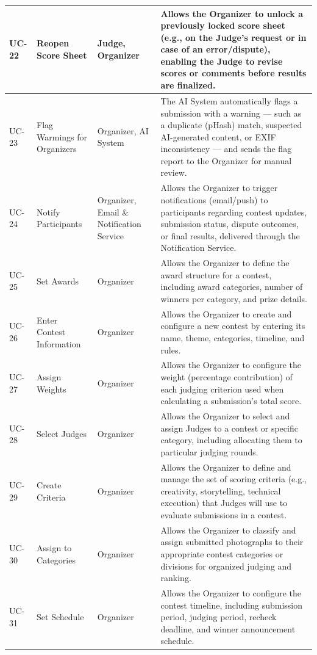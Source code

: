 \begin{longtable}{|>{\centering\arraybackslash}p{}|>{\raggedright\arraybackslash}p{}|>{\raggedright\arraybackslash}p{}|>{\raggedright\arraybackslash}p{}|}
\hline
UC-22 & Reopen Score Sheet & Judge, Organizer & Allows the Organizer to unlock a previously locked score sheet (e.g., on the Judge's request or in case of an error/dispute), enabling the Judge to revise scores or comments before results are finalized. \\
\hline
UC-23 & Flag Warmings for Organizers & Organizer, AI System & The AI System automatically flags a submission with a warning — such as a duplicate (pHash) match, suspected AI-generated content, or EXIF inconsistency — and sends the flag report to the Organizer for manual review. \\
\hline
UC-24 & Notify Participants & Organizer, Email \& Notification Service & Allows the Organizer to trigger notifications (email/push) to participants regarding contest updates, submission status, dispute outcomes, or final results, delivered through the Notification Service. \\
\hline
UC-25 & Set Awards & Organizer & Allows the Organizer to define the award structure for a contest, including award categories, number of winners per category, and prize details. \\
\hline
UC-26 & Enter Contest Information & Organizer & Allows the Organizer to create and configure a new contest by entering its name, theme, categories, timeline, and rules. \\
\hline
UC-27 & Assign Weights & Organizer & Allows the Organizer to configure the weight (percentage contribution) of each judging criterion used when calculating a submission's total score. \\
\hline
UC-28 & Select Judges & Organizer & Allows the Organizer to select and assign Judges to a contest or specific category, including allocating them to particular judging rounds. \\
\hline
UC-29 & Create Criteria & Organizer & Allows the Organizer to define and manage the set of scoring criteria (e.g., creativity, storytelling, technical execution) that Judges will use to evaluate submissions in a contest. \\
\hline
UC-30 & Assign to Categories & Organizer & Allows the Organizer to classify and assign submitted photographs to their appropriate contest categories or divisions for organized judging and ranking. \\
\hline
UC-31 & Set Schedule & Organizer & Allows the Organizer to configure the contest timeline, including submission period, judging period, recheck deadline, and winner announcement schedule. \\

\end{longtable}

